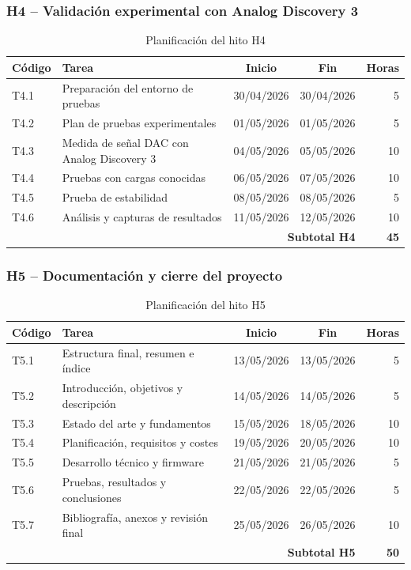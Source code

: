 \documentclass[11pt,a4paper]{article}
\begin{document}
\subsubsection{H4 -- Validación experimental con Analog Discovery 3}

\begin{table}[H]
\centering
\small
\begin{tabularx}{\textwidth}{lXccr}
\toprule
\textbf{Código} & \textbf{Tarea} & \textbf{Inicio} & \textbf{Fin} & \textbf{Horas} \\
\midrule
T4.1 & Preparación del entorno de pruebas & 30/04/2026 & 30/04/2026 & 5 \\
T4.2 & Plan de pruebas experimentales & 01/05/2026 & 01/05/2026 & 5 \\
T4.3 & Medida de señal DAC con Analog Discovery 3 & 04/05/2026 & 05/05/2026 & 10 \\
T4.4 & Pruebas con cargas conocidas & 06/05/2026 & 07/05/2026 & 10 \\
T4.5 & Prueba de estabilidad & 08/05/2026 & 08/05/2026 & 5 \\
T4.6 & Análisis y capturas de resultados & 11/05/2026 & 12/05/2026 & 10 \\
\midrule
\multicolumn{4}{r}{\textbf{Subtotal H4}} & \textbf{45} \\
\bottomrule
\end{tabularx}
\caption{Planificación del hito H4}
\label{tab:hito4}
\end{table}

\subsubsection{H5 -- Documentación y cierre del proyecto}

\begin{table}[H]
\centering
\small
\begin{tabularx}{\textwidth}{lXccr}
\toprule
\textbf{Código} & \textbf{Tarea} & \textbf{Inicio} & \textbf{Fin} & \textbf{Horas} \\
\midrule
T5.1 & Estructura final, resumen e índice & 13/05/2026 & 13/05/2026 & 5 \\
T5.2 & Introducción, objetivos y descripción & 14/05/2026 & 14/05/2026 & 5 \\
T5.3 & Estado del arte y fundamentos & 15/05/2026 & 18/05/2026 & 10 \\
T5.4 & Planificación, requisitos y costes & 19/05/2026 & 20/05/2026 & 10 \\
T5.5 & Desarrollo técnico y firmware & 21/05/2026 & 21/05/2026 & 5 \\
T5.6 & Pruebas, resultados y conclusiones & 22/05/2026 & 22/05/2026 & 5 \\
T5.7 & Bibliografía, anexos y revisión final & 25/05/2026 & 26/05/2026 & 10 \\
\midrule
\multicolumn{4}{r}{\textbf{Subtotal H5}} & \textbf{50} \\
\bottomrule
\end{tabularx}
\caption{Planificación del hito H5}
\label{tab:hito5}
\end{table}
\end{document}
